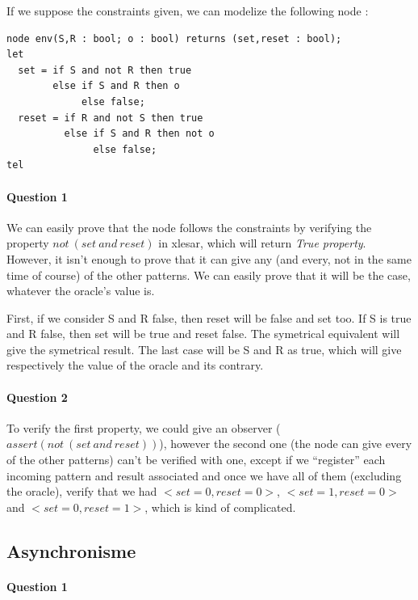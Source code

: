 \documentclass{article}
\begin{document}
If we suppose the constraints given, we can modelize the following node :

\begin{verbatim}
node env(S,R : bool; o : bool) returns (set,reset : bool);
let
  set = if S and not R then true
        else if S and R then o
             else false;
  reset = if R and not S then true
          else if S and R then not o
               else false;
tel
\end{verbatim}

\paragraph{Question 1} 

We can easily prove that the node follows the constraints
by verifying the property $not~(set~ and~ reset)$ in xlesar, which will return
\emph{True property}. However, it isn't enough to prove that it can give any
(and every, not in the same time of course) of the other patterns. We can easily
prove that it will be the case, whatever the oracle's value is.

First, if we consider S and R false, then reset will be false and set too. If
S is true and R false, then set will be true and reset false. The symetrical
equivalent will give the symetrical result. The last case will be S and R as
true, which will give respectively the value of the oracle and its contrary.

\paragraph{Question 2} 

To verify the first property, we could give an observer ($assert(not~(set~ and~
reset))$), however the second one (the node can give every of the other
patterns) can't be verified with one, except if we ``register'' each incoming
pattern and result associated  and once we have all of them (excluding the
oracle), verify that we had $<set=0, reset=0>$, $<set=1, reset=0>$ and $<set=0,
reset=1>$, which is kind of complicated.

\subsection{Asynchronisme}

\paragraph{Question 1}
\end{document}

